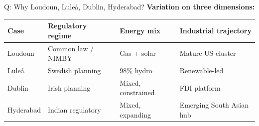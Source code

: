 \documentclass[aspectratio=169,12pt]{beamer}
\begin{document}
\begin{frame}[noframenumbering]{Q: Why Loudoun, Luleå, Dublin, Hyderabad?}
\footnotesize
\textbf{Variation on three dimensions:}\\[0.4em]
\begin{tabular}{@{}llll@{}}
  \toprule
  \textbf{Case} & \textbf{Regulatory regime} & \textbf{Energy mix} & \textbf{Industrial trajectory} \\
  \midrule
  Loudoun    & Common law / NIMBY  & Gas + solar       & Mature US cluster \\
  Lule\r{a}  & Swedish planning    & 98\% hydro        & Renewable-led \\
  Dublin     & Irish planning      & Mixed, constrained & FDI platform \\
  Hyderabad  & Indian regulatory   & Mixed, expanding  & Emerging South Asian hub \\
  \bottomrule
\end{tabular}
\end{frame}
\end{document}
